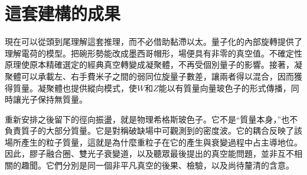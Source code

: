 \begin{classroomqa}
\end{classroomqa}

\section{這套建構的成果}

現在可以從頭到尾理解這套推理，而不必借助黏滯以太。量子化的內部旋轉提供了理解電荷的模型。把碗形勢能改成墨西哥帽形，場便具有非零的真空值。不確定性原理使原本精確選定的經典真空轉變成凝聚體，不再受個別量子的影響。接著，凝聚體可以承載左、右手費米子之間的弱同位旋量子數差，讓兩者得以混合，因而獲得質量。凝聚體也提供縱向模式，使$W$和$Z$能以有質量向量玻色子的形式傳播，同時讓光子保持無質量。

重新安排之後留下的徑向振盪，就是物理希格斯玻色子。它不是``質量本身，''也不負責質子的大部分質量。它是對稱破缺場中可觀測到的密度波。它的耦合反映了該場所產生的粒子質量，這就是為什麼重粒子在它的產生與衰變過程中占主導地位。因此，膠子融合圈、雙光子衰變道，以及聽眾最後提出的真空能問題，並非互不相關的趣聞。它們分別是同一個非平凡真空的後果、檢驗，以及尚待釐清的含意。
